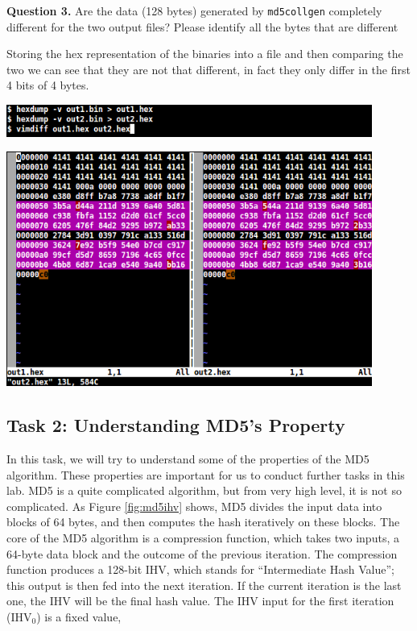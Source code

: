 \documentclass[a4paper]{article}
\begin{document}
\bigskip

\textbf{Question 3.} Are the data (128 bytes) generated by \texttt{md5collgen} completely different for the two output files? Please identify all the bytes that are different

\bigskip

Storing the hex representation of the binaries into a file and then comparing the two we can see that they are not that different, in fact they only differ in the first 4 bits of 4 bytes.

\bigskip

\includegraphics[width=0.9\textwidth]{bash/md5collgenoutdumpfile.png}

\bigskip

\bigskip

\includegraphics[width=0.9\textwidth]{bash/md5collgenoutdumpvimdiff.png}

\bigskip

\subsection{Task 2: Understanding MD5’s Property}

In this task, we will try to understand some of the properties of the MD5 algorithm. These properties are important for us to conduct further tasks in this lab. MD5 is a quite complicated algorithm, but from very high level, it is not so complicated. As Figure \ref{fig:md5ihv} shows, MD5 divides the input data into blocks of 64 bytes, and then computes the hash iteratively on these blocks. The core of the MD5 algorithm is a compression function, which takes two inputs, a 64-byte data block and the outcome of the previous iteration. The compression function produces a 128-bit IHV, which stands for “Intermediate Hash Value”; this output is then fed into the next iteration. If the current iteration is the last one, the IHV will be the final hash value. The IHV input for the first iteration (IHV$_0$) is a fixed value,
\end{document}
